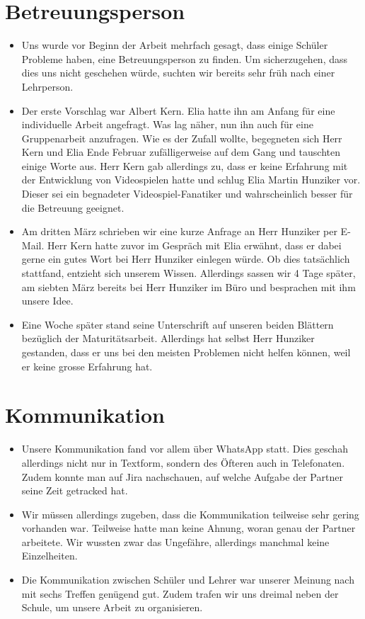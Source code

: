 \section{Betreuungsperson}
\begin{itemize}
    \item Uns wurde vor Beginn der Arbeit mehrfach gesagt, dass einige Schüler Probleme haben, eine Betreuungsperson zu finden. Um sicherzugehen, dass dies uns nicht geschehen würde, suchten wir bereits sehr früh nach einer Lehrperson.
    \item Der erste Vorschlag war Albert Kern. Elia hatte ihn am Anfang für eine individuelle Arbeit angefragt. Was lag näher, nun ihn auch für eine Gruppenarbeit anzufragen. Wie es der Zufall wollte, begegneten sich 
    Herr Kern und Elia Ende Februar zufälligerweise auf dem Gang und tauschten einige Worte aus. Herr Kern gab allerdings zu, dass er keine Erfahrung mit der Entwicklung von Videospielen hatte und schlug Elia Martin Hunziker vor.
    Dieser sei ein begnadeter Videospiel-Fanatiker und wahrscheinlich besser für die Betreuung geeignet. 
    \item Am dritten März schrieben wir eine kurze Anfrage an Herr Hunziker per E-Mail. Herr Kern hatte zuvor im Gespräch mit Elia erwähnt, dass er dabei gerne ein gutes Wort bei Herr Hunziker einlegen würde. Ob dies tatsächlich 
    stattfand, entzieht sich unserem Wissen. Allerdings sassen wir 4 Tage später, am siebten März bereits bei Herr Hunziker im Büro und besprachen mit ihm unsere Idee. 
    \item Eine Woche später stand seine Unterschrift auf unseren beiden Blättern bezüglich der Maturitätsarbeit. Allerdings hat selbst Herr Hunziker gestanden, dass er uns bei den meisten Problemen nicht helfen können, weil er
    keine grosse Erfahrung hat.
\end{itemize}

\section{Kommunikation}
\begin{itemize}
    \item Unsere Kommunikation fand vor allem über WhatsApp statt. Dies geschah allerdings nicht nur in Textform, sondern des Öfteren auch in Telefonaten. Zudem konnte man auf Jira nachschauen, auf welche Aufgabe der Partner
    seine Zeit getracked hat. 
    \item Wir müssen allerdings zugeben, dass die Kommunikation teilweise sehr gering vorhanden war. Teilweise hatte man keine Ahnung, woran genau der Partner arbeitete. Wir wussten zwar das Ungefähre, allerdings manchmal keine Einzelheiten.
    \item Die Kommunikation zwischen Schüler und Lehrer war unserer Meinung nach mit sechs Treffen genügend gut. Zudem trafen wir uns dreimal neben der Schule, um unsere Arbeit zu organisieren.
\end{itemize}



